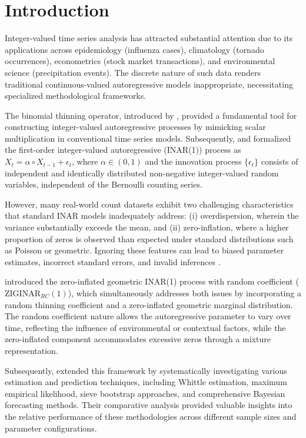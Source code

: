 \documentclass[twoside]{article}
\begin{document}
\section{Introduction}
Integer-valued time series analysis has attracted substantial attention due to its applications across epidemiology (influenza cases), climatology (tornado occurrences), econometrics (stock market transactions), and environmental science (precipitation events). The discrete nature of such data renders traditional continuous-valued autoregressive models inappropriate, necessitating specialized methodological frameworks.

The binomial thinning operator, introduced by \cite{Steutel:1979}, provided a fundamental tool for constructing integer-valued autoregressive processes by mimicking scalar multiplication in conventional time series models. Subsequently, \cite{McKenzie:1985} and \cite{AlOsh:1987} formalized the first-order integer-valued autoregressive (INAR(1)) process as $X_t = \alpha \circ X_{t-1} + \epsilon_t$, where $\alpha \in (0,1)$ and the innovation process $\{\epsilon_t\}$ consists of independent and identically distributed non-negative integer-valued random variables, independent of the Bernoulli counting series.

However, many real-world count datasets exhibit two challenging characteristics that standard INAR models inadequately address: (i) overdispersion, wherein the variance substantially exceeds the mean, and (ii) zero-inflation, where a higher proportion of zeros is observed than expected under standard distributions such as Poisson or geometric. Ignoring these features can lead to biased parameter estimates, incorrect standard errors, and invalid inferences \cite{Bakouch:2018}.

\cite{Bakouch:2018} introduced the zero-inflated geometric INAR(1) process with random coefficient ($\text{ZIGINAR}_{RC}(1)$), which simultaneously addresses both issues by incorporating a random thinning coefficient and a zero-inflated geometric marginal distribution. The random coefficient nature allows the autoregressive parameter to vary over time, reflecting the influence of environmental or contextual factors, while the zero-inflated component accommodates excessive zeros through a mixture representation.

Subsequently, \cite{Nasirzadeh:2024} extended this framework by systematically investigating various estimation and prediction techniques, including Whittle estimation, maximum empirical likelihood, sieve bootstrap approaches, and comprehensive Bayesian forecasting methods. Their comparative analysis provided valuable insights into the relative performance of these methodologies across different sample sizes and parameter configurations.
\end{document}
